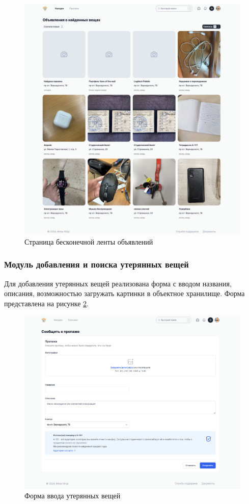 \begin{figure}[htb]
	\centering
	\includegraphics[width=.95\textwidth]{images/infinity-scroll-page.png}
	\parskip=6pt
	\caption{Страница бесконечной ленты объявлений}
	\label{fig:infinity-scroll-page}
\end{figure}

\subsubsection{Модуль добавления и поиска утерянных вещей}

Для добавления утерянных вещей реализована форма с вводом названия, описания, возможностью загружать картинки в объектное хранилище. Форма представлена на рисунке \ref{fig:lost-item-from-page}.

\begin{figure}[htb]
	\centering
	\includegraphics[width=.95\textwidth]{images/lost-item-from-page.png}
	\parskip=6pt
	\caption{Форма ввода утерянных вещей}
	\label{fig:lost-item-from-page}
\end{figure}

